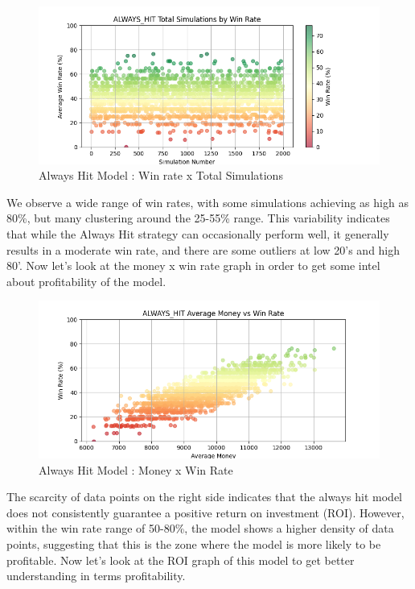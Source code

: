 \documentclass[a4paper,12pt]{report}
\begin{document}
\begin{figure}[h]
\begin{center}
\includegraphics[scale=0.6]{figures/graphs/ah_wr_ts.png}
\end{center}
\caption{Always Hit Model : Win rate x Total Simulations}
\label{fig:ah_wr_ts}
\end{figure}

We observe a wide range of win rates, with some simulations achieving as high as 80\%, but many clustering around the 25-55\% range. This variability indicates that while the Always Hit strategy can occasionally perform well, it generally results in a moderate win rate, and there are some outliers at low 20's and high 80'. Now let's look at the money x win rate graph in order to get some intel about profitability of the model.

\begin{figure}[h]
\begin{center}
\includegraphics[scale=0.6]{figures/graphs/ah_money_wr_big.png}
\end{center}
\caption{Always Hit Model : Money x Win Rate}
\label{fig:ah_money_wr}
\end{figure}

The scarcity of data points on the right side indicates that the always hit model does not consistently guarantee a positive return on investment (ROI). However, within the win rate range of 50-80\%, the model shows a higher density of data points, suggesting that this is the zone where the model is more likely to be profitable. Now let's look at the ROI graph of this model to get better understanding in terms profitability.
\end{document}
